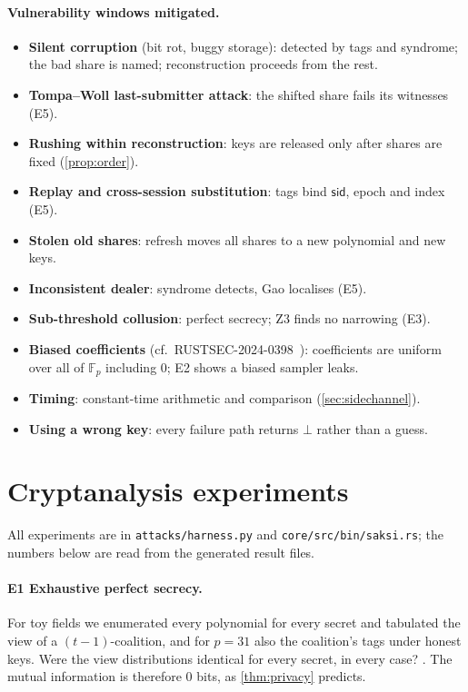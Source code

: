 \documentclass[11pt,a4paper]{article}
\theoremstyle{plain}
\theoremstyle{definition}
\newcommand{\F}{\mathbb{F}_p}
\begin{document}
\paragraph{Vulnerability windows mitigated.}
\begin{itemize}
  \item \textbf{Silent corruption} (bit rot, buggy storage): detected by tags and syndrome; the bad
  share is named; reconstruction proceeds from the rest.
  \item \textbf{Tompa--Woll last-submitter attack}: the shifted share fails its witnesses (E5).
  \item \textbf{Rushing within reconstruction}: keys are released only after shares are fixed
  (\cref{prop:order}).
  \item \textbf{Replay and cross-session substitution}: tags bind $\mathsf{sid}$, epoch and index (E5).
  \item \textbf{Stolen old shares}: refresh moves all shares to a new polynomial and new keys.
  \item \textbf{Inconsistent dealer}: syndrome detects, Gao localises (E5).
  \item \textbf{Sub-threshold collusion}: perfect secrecy; Z3 finds no narrowing (E3).
  \item \textbf{Biased coefficients} (cf.\ RUSTSEC-2024-0398~\cite{rustsec}): coefficients are uniform
  over all of $\F$ including $0$; E2 shows a biased sampler leaks.
  \item \textbf{Timing}: constant-time arithmetic and comparison (\cref{sec:sidechannel}).
  \item \textbf{Using a wrong key}: every failure path returns $\bot$ rather than a guess.
\end{itemize}

\section{Cryptanalysis experiments}\label{sec:experiments}

All experiments are in \texttt{attacks/harness.py} and \texttt{core/src/bin/saksi.rs}; the numbers
below are read from the generated result files.

\paragraph{E1 Exhaustive perfect secrecy.} For toy fields \EonePrimes{} we enumerated every
polynomial for every secret and tabulated the view of a $(t-1)$-coalition, and for $p=31$ also the
coalition's tags under honest keys. Were the view distributions identical for every secret, in every case? \EoneAllIdentical{}. The
mutual information is therefore $0$ bits, as \cref{thm:privacy} predicts.
\end{document}
